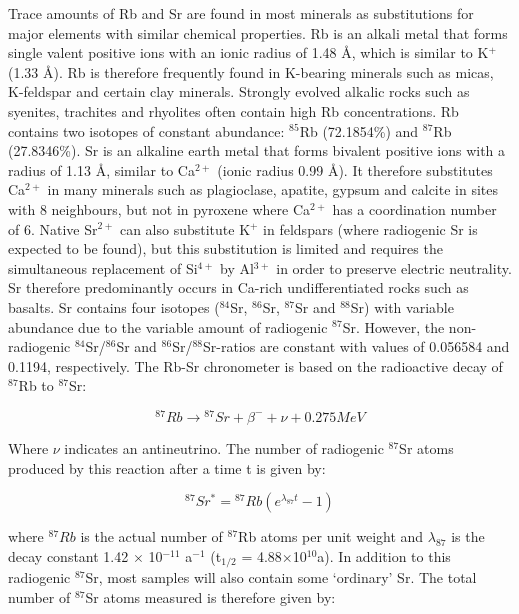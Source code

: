 \documentclass{book}
\begin{document}
Trace amounts of Rb and Sr are found in most minerals as substitutions
for major elements with similar chemical properties. Rb is an alkali
metal that forms single valent positive ions with an ionic radius of
1.48 \AA, which is similar to K$^+$ (1.33 \AA).  Rb is therefore
frequently found in K-bearing minerals such as micas, K-feldspar and
certain clay minerals. Strongly evolved alkalic rocks such as
syenites, trachites and rhyolites often contain high Rb
concentrations.  Rb contains two isotopes of constant abundance:
$^{85}$Rb (72.1854\%) and $^{87}$Rb (27.8346\%). Sr is an alkaline
earth metal that forms bivalent positive ions with a radius of 1.13
\AA, similar to Ca$^{2+}$ (ionic radius 0.99 \AA). It therefore
substitutes Ca$^{2+}$ in many minerals such as plagioclase, apatite,
gypsum and calcite in sites with 8 neighbours, but not in pyroxene
where Ca$^{2+}$ has a coordination number of 6. Native Sr$^{2+}$ can
also substitute K$^+$ in feldspars (where radiogenic Sr is expected to
be found), but this substitution is limited and requires the
simultaneous replacement of Si$^{4+}$ by Al$^{3+}$ in order to
preserve electric neutrality.  Sr therefore predominantly occurs in
Ca-rich undifferentiated rocks such as basalts. Sr contains four
isotopes ($^{84}$Sr, $^{86}$Sr, $^{87}$Sr and $^{88}$Sr) with variable
abundance due to the variable amount of radiogenic $^{87}$Sr. However,
the non-radiogenic $^{84}$Sr/$^{86}$Sr and $^{86}$Sr/$^{88}$Sr-ratios
are constant with values of 0.056584 and 0.1194, respectively. The
Rb-Sr chronometer is based on the radioactive decay of $^{87}$Rb to
$^{87}$Sr:

\begin{equation}
{}^{87}Rb \rightarrow {}^{87}Sr + \beta^- + \nu +
0.275 MeV
\label{eq:87Rb}
\end{equation}

Where $\nu$ indicates an antineutrino. The number of radiogenic
${}^{87}$Sr atoms produced by this reaction after a time t is given
by:

\begin{equation}
{}^{87}Sr^* = {}^{87}Rb (e^{\lambda_{87} t} - 1)
\label{eq:87Sr*}
\end{equation}

where $^{87}Rb$ is the actual number of $^{87}$Rb atoms per unit
weight and $\lambda_{87}$ is the decay constant 1.42 $\times$
10$^{-11}$ a$^{-1}$ (t$_{1/2}$ = 4.88$\times$10$^{10}$a).  In addition
to this radiogenic $^{87}$Sr, most samples will also contain some
`ordinary' Sr. The total number of $^{87}$Sr atoms measured is
therefore given by:
\end{document}
